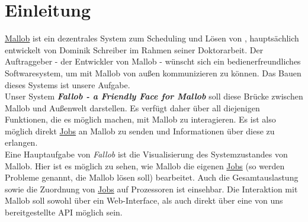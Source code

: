 \section{Einleitung}



\href{https://github.com/domschrei/mallob}{Mallob} ist ein dezentrales System zum Scheduling und Lösen von , hauptsächlich entwickelt von Dominik Schreiber im Rahmen seiner Doktorarbeit. Der Auftraggeber - der Entwickler von Mallob - wünscht sich ein bedienerfreundliches Softwaresystem, um mit Mallob von außen kommunizieren zu können. Das Bauen dieses Systems ist unsere Aufgabe.\\
Unser System \textbf{\textit{Fallob - a Friendly Face for Mallob}} soll diese Brücke zwischen Mallob und Außenwelt darstellen.
Es verfügt daher über all diejenigen Funktionen, die es möglich machen, mit Mallob zu interagieren. Es ist also möglich direkt \hyperref[B:Jobs]{Jobs} an Mallob zu senden und Informationen über diese zu erlangen.\\
Eine Hauptaufgabe von \textit{Fallob} ist die Visualisierung des Systemzustandes von Mallob. Hier ist es möglich zu sehen, wie Mallob die eigenen \hyperref[B:Jobs]{Jobs} (so werden Probleme genannt, die Mallob lösen soll) bearbeitet. Auch die Gesamtauslastung sowie die Zuordnung von \hyperref[B:Jobs]{Jobs} auf Prozessoren ist einsehbar. 
Die Interaktion mit Mallob soll sowohl über ein \gls{Web-Interface}, als auch direkt über eine von uns bereitgestellte \gls{API} möglich sein. %




